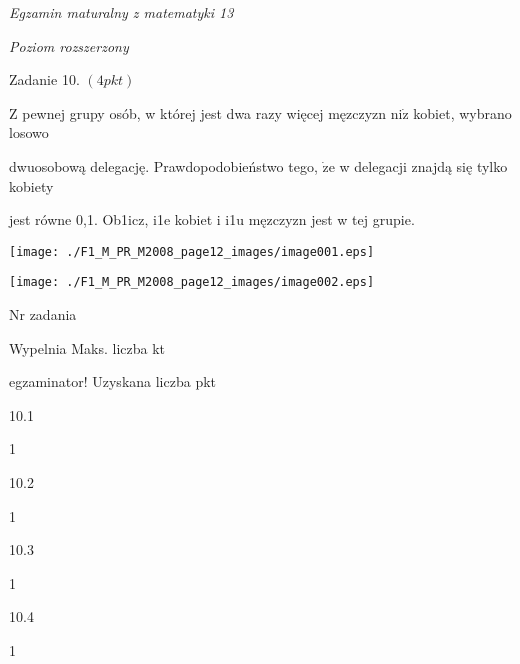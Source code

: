 \documentclass[a4paper,12pt]{article}
\begin{document}
{\it Egzamin maturalny z matematyki 13}

{\it Poziom rozszerzony}

Zadanie 10. $(4pkt)$

$\mathrm{Z}$ pewnej grupy osób, w której jest dwa razy więcej męzczyzn $\mathrm{n}\mathrm{i}\dot{\mathrm{z}}$ kobiet, wybrano losowo

dwuosobową delegację. Prawdopodobieństwo tego, $\dot{\mathrm{z}}\mathrm{e}$ w delegacji znajdą się tylko kobiety

jest równe 0,1. Ob1icz, i1e kobiet i i1u męzczyzn jest w tej grupie.
\begin{center}
\texttt{[image: ./F1\_M\_PR\_M2008\_page12\_images/image001.eps]}

\texttt{[image: ./F1\_M\_PR\_M2008\_page12\_images/image002.eps]}
\end{center}
Nr zadania

Wypelnia Maks. liczba kt

egzaminator! Uzyskana liczba pkt

10.1

1

10.2

1

10.3

1

10.4

1
\end{document}
